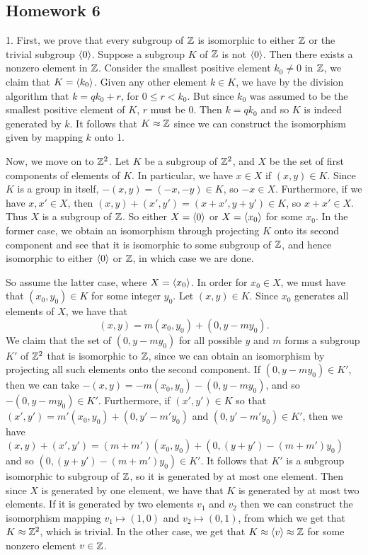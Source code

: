 \subsection{Homework 6}
1. First, we prove that every subgroup of $\mathbb{Z}$ is isomorphic to either $\mathbb{Z}$ or the trivial subgroup $\langle0\rangle$. Suppose a subgroup $K$ of $\mathbb{Z}$ is not $\langle0\rangle$. Then there exists a nonzero element in $\mathbb{Z}$. Consider the smallest positive element $k_0 \neq 0$ in $\mathbb{Z}$, we claim that $K = \langle k_0\rangle$. Given any other element $k \in K$, we have by the division algorithm that $k = qk_0 + r$, for $0 \leq r < k_0$. But since $k_0$ was assumed to be the smallest positive element of $K$, $r$ must be 0. Then $k = qk_0$ and so $K$ is indeed generated by $k$. It follows that $K \approx \mathbb{Z}$ since we can construct the isomorphism given by mapping $k$ onto 1.

Now, we move on to $\mathbb{Z}^2$. Let $K$ be a subgroup of $\mathbb{Z}^2$, and $X$ be the set of first components of elements of $K$. In particular, we have $x \in X$ if $(x, y) \in K$. Since $K$ is a group in itself, $-(x, y) = (-x, -y) \in K$, so $-x \in X$. Furthermore, if we have $x, x' \in X$, then $(x, y) + (x', y') = (x + x', y + y') \in K$, so $x + x' \in X$. Thus $X$ is a subgroup of $\mathbb{Z}$. So either $X = \langle0\rangle$ or $X = \langle x_0\rangle$ for some $x_0$. In the former case, we obtain an isomorphism through projecting $K$ onto its second component and see that it is isomorphic to some subgroup of $\mathbb{Z}$, and hence isomorphic to either $\langle0\rangle$ or $\mathbb{Z}$, in which case we are done. 

So assume the latter case, where $X = \langle x_0\rangle$. In order for $x_0 \in X$, we must have that $(x_0, y_0) \in K$ for some integer $y_0$. Let $(x, y) \in K$. Since $x_0$ generates all elements of $X$, we have that
\[
    (x, y) = m(x_0, y_0) + (0, y - my_0).
\]
We claim that the set of $(0, y - my_0)$ for all possible $y$ and $m$ forms a subgroup $K'$ of $\mathbb{Z}^2$ that is isomorphic to $\mathbb{Z}$, since we can obtain an isomorphism by projecting all such elements onto the second component. If $(0, y - my_0) \in K'$, then we can take $-(x, y) = -m(x_0, y_0) - (0, y - my_0)$, and so $-(0, y - my_0) \in K'$. Furthermore, if $(x', y') \in K$ so that $(x', y') = m'(x_0, y_0) + (0, y' - m'y_0)$ and $(0, y' - m'y_0) \in K'$, then we have $(x, y) + (x', y') = (m + m')(x_0, y_0) + (0, (y + y') - (m + m')y_0)$ and so $(0, (y + y') - (m + m')y_0) \in K'$. It follows that $K'$ is a subgroup isomorphic to subgroup of $\mathbb{Z}$, so it is generated by at most one element. Then since $X$ is generated by one element, we have that $K$ is generated by at most two elements. If it is generated by two elements $v_1$ and $v_2$ then we can construct the isomorphism mapping $v_1 \mapsto (1, 0)$ and $v_2 \mapsto (0, 1)$, from which we get that $K \approx \mathbb{Z}^2$, which is trivial. In the other case, we get that $K \approx \langle v\rangle \approx \mathbb{Z}$ for some nonzero element $v \in \mathbb{Z}$.

